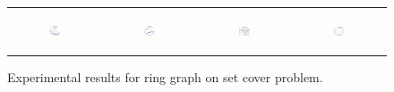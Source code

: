 \begin{figure}[ht]
\begin{tabular}{cccc}
	  \begin{subfigure}[h]{0.22\textwidth}
	  	\includegraphics[width=105pt]{images/runtime_ring_maxgraphcut.pdf}
			\caption{}
			\label{appfig:runtime_ring_maxgraphcut}
	  \end{subfigure} &
	  \begin{subfigure}[h]{0.22\textwidth}
	  	\includegraphics[width=105pt]{images/speedup_ring_maxgraphcut.pdf}
			\caption{}
			\label{appfig:speedup_ring_maxgraphcut}
	  \end{subfigure} &
	  \begin{subfigure}[h]{0.22\textwidth}
	  	\includegraphics[width=105pt]{images/diffFA_CF2G_ring_maxgraphcut.pdf}
			\caption{}
			\label{appfig:diffFA_CF2G_ring_maxgraphcut}
	  \end{subfigure} &
	  \begin{subfigure}[h]{0.22\textwidth}
	  	\includegraphics[width=105pt]{images/validated_CC2G_ring_maxgraphcut.pdf}
			\caption{}
			\label{appfig:validated_CC2G_ring_maxgraphcut.pdf}
	  \end{subfigure} \\
  \end{tabular}
  \caption{\footnotesize Experimental results for ring graph on set cover problem.}
\label{appfig:results_adversarial}
\end{figure}











